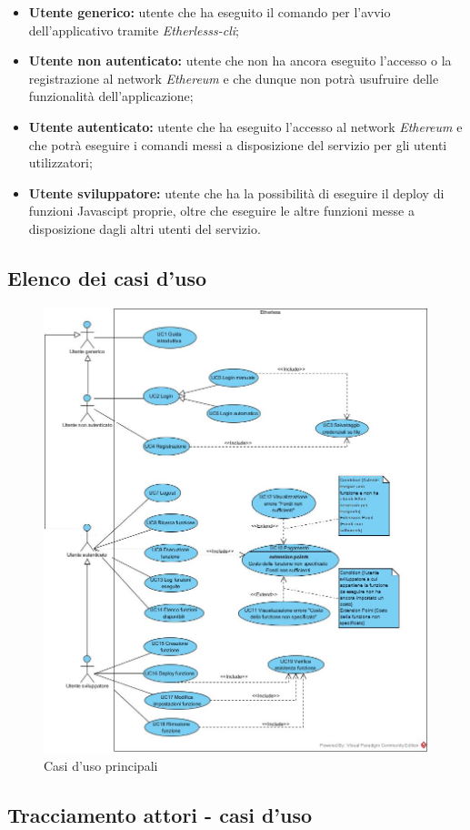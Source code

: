 \begin{itemize}
	\item \textbf{Utente generico:} utente che ha eseguito il comando per l'avvio dell'applicativo tramite \textit{Etherlesss-cli};
	\item \textbf{Utente non autenticato:} utente che non ha ancora eseguito l'accesso o la registrazione al network \textit{Ethereum\glo} e che dunque non potrà usufruire delle funzionalità dell'applicazione;
	\item \textbf{Utente autenticato:} utente che ha eseguito l'accesso al network \textit{Ethereum\glo} e che potrà eseguire i comandi messi a disposizione del servizio per gli utenti utilizzatori;
	\item \textbf{Utente sviluppatore:} utente che ha la possibilità di eseguire il deploy di funzioni Javascipt proprie, oltre che eseguire le altre funzioni messe a disposizione dagli altri utenti del servizio.
\end{itemize}



\subsection{Elenco dei casi d'uso}

\begin{figure}[h]
	\centering
	\includegraphics[width=12.3cm]{res/img/useCaseDiagram.jpg}
	\caption{Casi d'uso principali}
\end{figure}
\newpage








	
\subsection{Tracciamento attori - casi d'uso}	